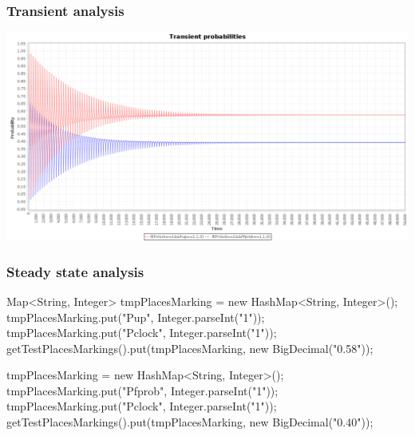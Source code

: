 \begin{frame}
  \frametitle{Transient analysis}
  \begin{center}
    \includegraphics[width=\textwidth]{img/rejuvenationTrans.png}    
  \end{center}
\end{frame}

\begin{frame}[fragile]
  \frametitle{Steady state analysis}
  \footnotesize
  \begin{jblock}
Map<String, Integer> tmpPlacesMarking = new HashMap<String, Integer>();
tmpPlacesMarking.put("Pup", Integer.parseInt("1"));
tmpPlacesMarking.put("Pclock", Integer.parseInt("1"));
getTestPlacesMarkings().put(tmpPlacesMarking, new BigDecimal("0.58"));

tmpPlacesMarking = new HashMap<String, Integer>();
tmpPlacesMarking.put("Pfprob", Integer.parseInt("1"));
tmpPlacesMarking.put("Pclock", Integer.parseInt("1"));
getTestPlacesMarkings().put(tmpPlacesMarking, new BigDecimal("0.40"));
  \end{jblock}
\end{frame}
